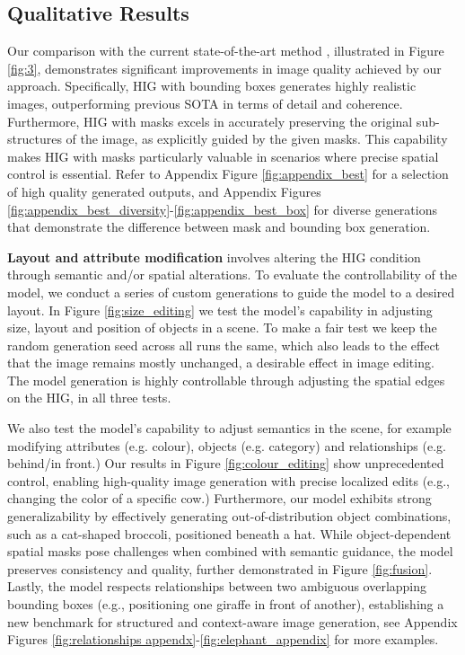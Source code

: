 \subsection{Qualitative Results} 

Our comparison with the current state-of-the-art method \cite{zheng_layoutdiffusion_2024}, illustrated in Figure \ref{fig:3}, demonstrates significant improvements in image quality achieved by our approach. Specifically, HIG with bounding boxes generates highly realistic images, outperforming previous SOTA in terms of detail and coherence. Furthermore, HIG with masks excels in accurately preserving the original sub-structures of the image, as explicitly guided by the given masks. This capability makes HIG with masks particularly valuable in scenarios where precise spatial control is essential. Refer to Appendix Figure \ref{fig:appendix_best} for a selection of high quality generated outputs, and Appendix Figures \ref{fig:appendix_best_diversity}-\ref{fig:appendix_best_box} for diverse generations that demonstrate the difference between mask and bounding box generation.

\textbf{Layout and attribute modification} involves altering the HIG condition through semantic and/or spatial alterations. To evaluate the controllability of the model, we conduct a series of custom generations to guide the model to a desired layout. In Figure \ref{fig:size_editing} we test the model's capability in adjusting size, layout and position of objects in a scene. To make a fair test we keep the random generation seed across all runs the same, which also leads to the effect that the image remains mostly unchanged, a desirable effect in image editing. The model generation is highly controllable through adjusting the spatial edges on the HIG, in all three tests.

We also test the model's capability to adjust semantics in the scene, for example modifying attributes (e.g. colour), objects (e.g. category) and relationships (e.g. behind/in front.) Our results in Figure \ref{fig:colour_editing} show unprecedented control, enabling high-quality image generation with precise localized edits (e.g., changing the color of a specific cow.) Furthermore, our model exhibits strong generalizability by effectively generating out-of-distribution object combinations, such as a cat-shaped broccoli, positioned beneath a hat. While object-dependent spatial masks pose challenges when combined with semantic guidance, the model preserves consistency and quality, further demonstrated in Figure \ref{fig:fusion}. Lastly, the model respects relationships between two ambiguous overlapping bounding boxes (e.g., positioning one giraffe in front of another), establishing a new benchmark for structured and context-aware image generation, see Appendix Figures \ref{fig:relationships appendx}-\ref{fig:elephant_appendix} for more examples.

